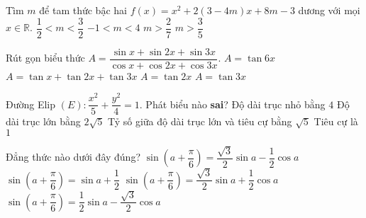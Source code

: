 \begin{ex}%
Tìm $m$ để tam thức bậc hai $f(x)=x^2+2(3-4m)x+8m-3$ dương với mọi $x\in\mathbb{R}$.
\choice
{\True $\dfrac{1}{2}<m<\dfrac{3}{2}$}
{$-1<m<4$}
{$m>\dfrac{2}{7}$}
{$m>\dfrac{3}{5}$}
\end{ex}

\begin{ex}%
Rút gọn biểu thức $A=\dfrac{\sin x+\sin2x+\sin3x}{\cos x+\cos2x+\cos3x}$.
\choice
{$A=\tan6x$}
{$A=\tan x+\tan2x+\tan3x$}
{\True $A=\tan2x$}
{$A=\tan3x$}	
\end{ex}

\begin{ex}%
Đường Elip $(E): \dfrac{x^2}{5}+\dfrac{y^2}{4}=1$. Phát biểu nào {\bf sai}?
\choice
{Độ dài trục nhỏ bằng $4$}
{Độ dài trục lớn bằng $2\sqrt{5}$}
{Tỷ số giữa độ dài trục lớn và tiêu cự bằng $\sqrt{5}$}
{\True Tiêu cự là $1$}
\end{ex}

\begin{ex}%
Đẳng thức nào dưới đây đúng?
\choice
{$\sin\left(a+\dfrac{\pi}{6}\right)=\dfrac{\sqrt{3}}{2}\sin a-\dfrac{1}{2}\cos a$}
{$\sin\left(a+\dfrac{\pi}{6}\right)=\sin a+\dfrac{1}{2}$}
{\True $\sin\left(a+\dfrac{\pi}{6}\right)=\dfrac{\sqrt{3}}{2}\sin a+\dfrac{1}{2}\cos a$}
{$\sin\left(a+\dfrac{\pi}{6}\right)=\dfrac{1}{2}\sin a-\dfrac{\sqrt{3}}{2}\cos a$}
\end{ex}

